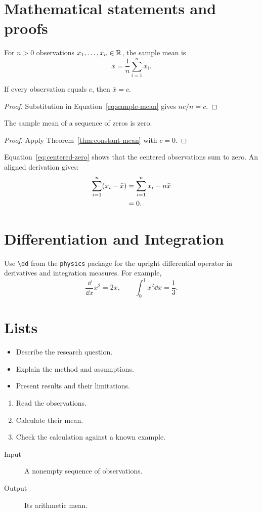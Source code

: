 \section{Mathematical statements and proofs}
\begin{definition}
  For $n>0$ observations $x_1,\ldots,x_n\in\mathbb{R}$, the sample mean is
  \begin{equation}
    \label{eq:sample-mean}
    \bar{x} = \frac{1}{n} \sum_{i=1}^{n} x_i.
  \end{equation}
\end{definition}
\begin{theorem}
  \label{thm:constant-mean}
  If every observation equals $c$, then $\bar{x}=c$.
\end{theorem}
\begin{proof}
  Substitution in Equation~\eqref{eq:sample-mean} gives $nc/n=c$.
\end{proof}
\begin{corollary}
  The sample mean of a sequence of zeros is zero.
\end{corollary}
\begin{proof}
  Apply Theorem~\ref{thm:constant-mean} with $c=0$.
\end{proof}
Equation~\eqref{eq:centered-zero} shows that the centered observations sum to
zero. An aligned derivation gives:
\begin{align}
  \sum_{i=1}^{n}(x_i-\bar{x}) &= \sum_{i=1}^{n} x_i - n \bar{x}
  \notag\\
  &= 0.\label{eq:centered-zero}
\end{align}


\section{Differentiation and Integration}
Use \verb|\dd| from the \texttt{physics} package for the upright differential
operator in derivatives and integration measures. For example,
\[
  \frac{\dd}{\dd x} x^2 = 2x,
  \qquad
  \int_0^1 x^2 \dd{x} = \frac{1}{3}.
\]


\section{Lists}
\begin{itemize}
  \item Describe the research question.
  \item Explain the method and assumptions.
  \item Present results and their limitations.
\end{itemize}
\begin{enumerate}
  \item Read the observations.
  \item Calculate their mean.
  \item Check the calculation against a known example.
\end{enumerate}
\begin{description}
  \item[Input] A nonempty sequence of observations.
  \item[Output] Its arithmetic mean.
\end{description}


